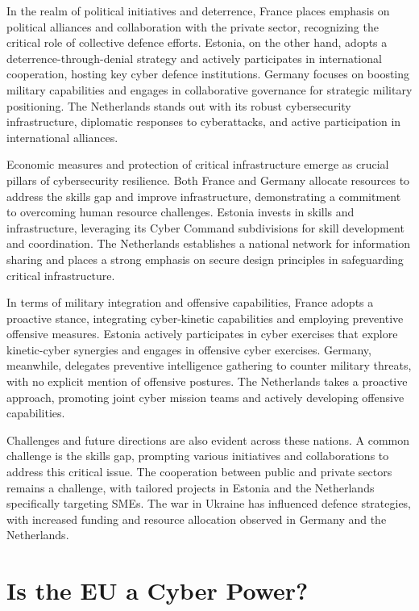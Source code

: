 In the realm of political initiatives and deterrence, France places emphasis on political alliances and collaboration with the private sector, recognizing the critical role of collective defence efforts. Estonia, on the other hand, adopts a deterrence-through-denial strategy and actively participates in international cooperation, hosting key cyber defence institutions. Germany focuses on boosting military capabilities and engages in collaborative governance for strategic military positioning. The Netherlands stands out with its robust cybersecurity infrastructure, diplomatic responses to cyberattacks, and active participation in international alliances.

Economic measures and protection of critical infrastructure emerge as crucial pillars of cybersecurity resilience. Both France and Germany allocate resources to address the skills gap and improve infrastructure, demonstrating a commitment to overcoming human resource challenges. Estonia invests in skills and infrastructure, leveraging its Cyber Command subdivisions for skill development and coordination. The Netherlands establishes a national network for information sharing and places a strong emphasis on secure design principles in safeguarding critical infrastructure.

In terms of military integration and offensive capabilities, France adopts a proactive stance, integrating cyber-kinetic capabilities and employing preventive offensive measures. Estonia actively participates in cyber exercises that explore kinetic-cyber synergies and engages in offensive cyber exercises. Germany, meanwhile, delegates preventive intelligence gathering to counter military threats, with no explicit mention of offensive postures. The Netherlands takes a proactive approach, promoting joint cyber mission teams and actively developing offensive capabilities.

Challenges and future directions are also evident across these nations. A common challenge is the skills gap, prompting various initiatives and collaborations to address this critical issue. The cooperation between public and private sectors remains a challenge, with tailored projects in Estonia and the Netherlands specifically targeting SMEs. The war in Ukraine has influenced defence strategies, with increased funding and resource allocation observed in Germany and the Netherlands.

\section*{Is the EU a Cyber Power?}

